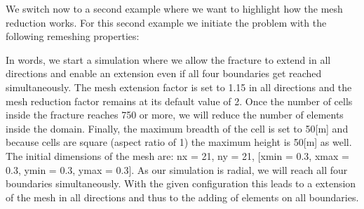\documentclass[letterpaper,10pt,english]{sphinxmanual}
\begin{document}
\sphinxAtStartPar
We switch now to a second example where we want to highlight how the mesh reduction works. For this second example  we
initiate the problem with the following re\sphinxhyphen{}meshing properties:

\begin{sphinxVerbatim}[commandchars=\\\{\}]
   
   

     

  
\PYG{p}{[}\PYG{p}{]}
  
  
\end{sphinxVerbatim}

\sphinxAtStartPar
In words, we start a simulation where we allow the fracture to extend in all directions and enable an extension even if
all four boundaries get reached simultaneously. The mesh extension factor is set to 1.15 in all directions and the mesh
reduction factor remains at its default value of 2. Once the number of cells inside the fracture reaches 750 or more, we
will reduce the number of elements inside the domain. Finally, the maximum breadth of the cell is set to 50{[}m{]} and
because cells are square (aspect ratio of 1) the maximum height is 50{[}m{]} as well. The initial dimensions of the mesh
are: nx = 21, ny = 21, {[}xmin = \sphinxhyphen{}0.3, xmax = 0.3, ymin = \sphinxhyphen{}0.3, ymax = 0.3{]}. As our simulation is radial, we will reach
all four boundaries simultaneously. With the given configuration this leads to a extension of the mesh in all directions
and thus to the adding of elements on all boundaries.

\noindent{}
\end{document}
